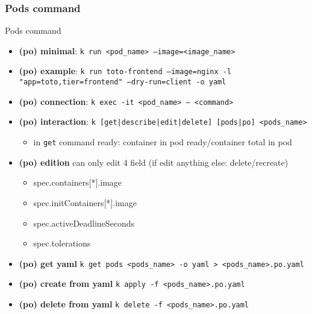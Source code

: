 \subsubsection{Pods command}
\begin{frame}{Pods command}
\begin{itemize}
  \item \textbf{(po) minimal}: \texttt{k run <pod\_name> --image=<image\_name>}
  \item \textbf{(po) example}: \texttt{k run toto-frontend --image=nginx -l "app=toto,tier=frontend" --dry-run=client -o yaml}
  \item \textbf{(po) connection}: \texttt{k exec -it <pod\_name> -- <command>}
  \item \textbf{(po) interaction}: \texttt{k [get|describe|edit|delete] [pods|po] <pods\_name>}
  \begin{itemize}
    \item in \texttt{get} command ready: container in pod ready/container total in pod
  \end{itemize}
  \item \textbf{(po) edition} can only edit 4 field (if edit anything else: delete/recreate)
  \begin{itemize}
    \item spec.containers[*].image
    \item spec.initContainers[*].image
    \item spec.activeDeadlineSeconds
    \item spec.tolerations
  \end{itemize}
  \item \textbf{(po) get yaml} \texttt{k get pods <pods\_name> -o yaml > <pods\_name>.po.yaml}
  \item \textbf{(po) create from yaml} \texttt{k apply -f <pods\_name>.po.yaml}
  \item \textbf{(po) delete from yaml} \texttt{k delete -f <pods\_name>.po.yaml}
\end{itemize}

\end{frame}
